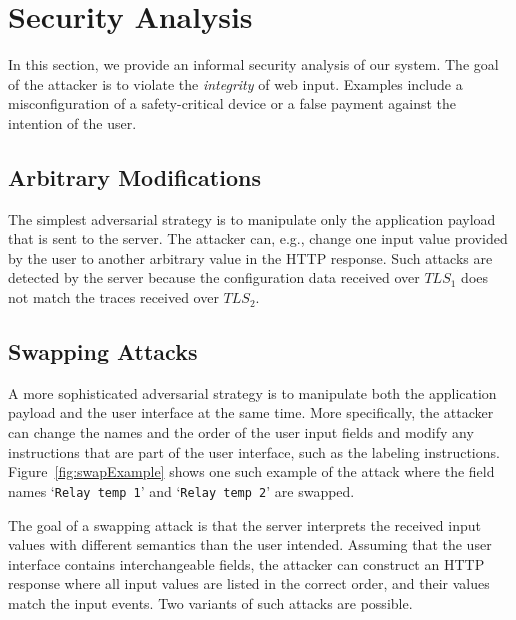 \section{Security Analysis}
\label{sec:securityAnalysis_IK}

In this section, we provide an informal security analysis of our system. The goal of the attacker is to violate the \emph{integrity} of web input. Examples include a misconfiguration of a safety-critical device or a false payment against the intention of the user. 

\subsection{Arbitrary Modifications} 

The simplest adversarial strategy is to manipulate only the application payload that is sent to the server. The attacker can, e.g., change one input value provided by the user to another arbitrary value in the HTTP response. Such attacks are detected by the server because the configuration data received over $TLS_1$ does not match the traces received over $TLS_2$.


\subsection{Swapping Attacks}

A more sophisticated adversarial strategy is to manipulate both the application payload and the user interface at the same time. More specifically, the attacker can change the names and the order of the user input fields and modify any instructions that are part of the user interface, such as the labeling instructions. Figure~\ref{fig:swapExample} shows one such example of the attack where the field names `\texttt{Relay temp 1}' and `\texttt{Relay temp 2}' are swapped.


The goal of a swapping attack is that the server interprets the received input values with different semantics than the user intended. Assuming that the user interface contains interchangeable fields, the attacker can construct an HTTP response where all input values are listed in the correct order, and their values match the input events. Two variants of such attacks are possible. 

